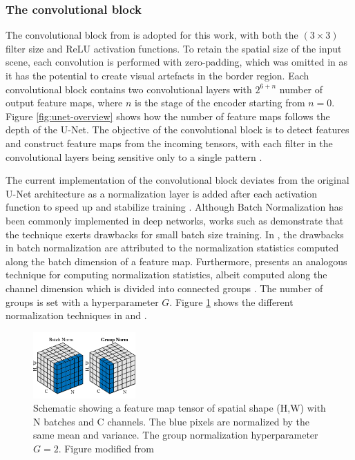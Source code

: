 \documentclass[../main/thesis]{subfiles}
\begin{document}
\subsubsection{The convolutional block}
The convolutional block from \citet{Ronneberger2015} is adopted for this work, with both the $(3 \times 3)$ filter size and ReLU \citep{Nair2010} activation functions. To retain the spatial size of the input scene, each convolution is performed with zero-padding, which was omitted in \citet{Ronneberger2015} as it has the potential to create visual artefacts in the border region. Each convolutional block contains two convolutional layers with $2^{6 + n}$ number of output feature maps, where $n$ is the stage of the encoder starting from $n = 0$. Figure \ref{fig:unet-overview} shows how the number of feature maps follows the depth of the U-Net. The objective of the convolutional block is to detect features and construct feature maps from the incoming tensors, with each filter in the convolutional layers being sensitive only to a single pattern \citep{Fukushima1980}.

The current implementation of the convolutional block deviates from the original U-Net architecture as a normalization layer is added after each activation function to speed up and stabilize training \citep{Ioffe2015}. Although Batch Normalization has been commonly implemented in deep networks, works such as \citet{Wu2018} demonstrate that the technique exerts drawbacks for small batch size training. In \citet{Wu2018}, the drawbacks in batch normalization are attributed to the normalization statistics computed along the batch dimension of a feature map. Furthermore, \citet{Wu2018} presents an analogous technique for computing normalization statistics, albeit computed along the channel dimension which is divided into connected groups \citep{Wu2018}. The number of groups is set with a hyperparameter $G$. Figure \ref{fig:BNGN} shows the different normalization techniques in \citet{Ioffe2015} and \citet{Wu2018}.

\begin{figure}
    \centering
    \includegraphics[width=0.35\textwidth]{BNandGN.png}
    \caption{\label{fig:BNGN}Schematic showing a feature map tensor of spatial shape (H,W) with N batches and C channels. The blue pixels are normalized by the same mean and variance. The group normalization hyperparameter $G = 2$. Figure modified from \protect\citet{Wu2018}}
\end{figure}
\end{document}
